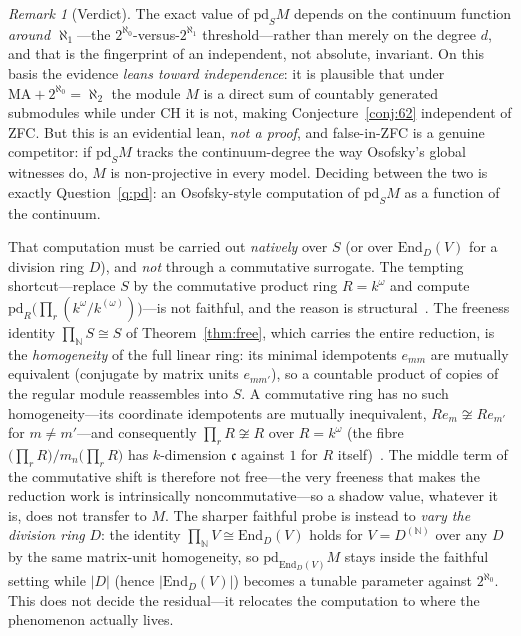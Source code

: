 \documentclass[11pt,reqno]{amsart}
\theoremstyle{plain}
\theoremstyle{definition}
\theoremstyle{remark}
\newtheorem{remark}[theorem]{Remark}
\newcommand{\End}{\mathrm{End}}
\newcommand{\pd}{\mathrm{pd}}
\newcommand{\N}{\mathbb{N}}
\begin{document}
\begin{remark}[Verdict]\label{rem:verdict}
The exact value of $\pd_S M$ depends on the continuum function \emph{around $\aleph_1$}---the $2^{\aleph_0}$-versus-$2^{\aleph_1}$ threshold---rather than merely on the degree $d$, and that is the fingerprint of an independent, not absolute, invariant. On this basis the evidence \emph{leans toward independence}: it is plausible that under $\mathrm{MA}+2^{\aleph_0}=\aleph_2$ the module $M$ is a direct sum of countably generated submodules while under CH it is not, making Conjecture~\ref{conj:62} independent of ZFC. But this is an evidential lean, \emph{not a proof}, and false-in-ZFC is a genuine competitor: if $\pd_S M$ tracks the continuum-degree the way Osofsky's global witnesses do, $M$ is non-projective in every model. Deciding between the two is exactly Question~\ref{q:pd}: an Osofsky-style computation of $\pd_S M$ as a function of the continuum.

That computation must be carried out \emph{natively} over $S$ (or over $\End_D(V)$ for a division ring $D$), and \emph{not} through a commutative surrogate. The tempting shortcut---replace $S$ by the commutative product ring $R=k^{\omega}$ and compute $\pd_R\bigl(\prod_r(k^{\omega}/k^{(\omega)})\bigr)$---is not faithful, and the reason is structural~\cite{macbeth-shadow}. The freeness identity $\prod_{\N}S\cong S$ of Theorem~\ref{thm:free}, which carries the entire reduction, is the \emph{homogeneity} of the full linear ring: its minimal idempotents $e_{mm}$ are mutually equivalent (conjugate by matrix units $e_{mm'}$), so a countable product of copies of the regular module reassembles into $S$. A commutative ring has no such homogeneity---its coordinate idempotents are mutually inequivalent, $Re_m\not\cong Re_{m'}$ for $m\ne m'$---and consequently $\prod_r R\not\cong R$ over $R=k^{\omega}$ (the fibre $\bigl(\prod_r R\bigr)/m_n\bigl(\prod_r R\bigr)$ has $k$-dimension $\mathfrak c$ against $1$ for $R$ itself)~\cite[\S1--2]{macbeth-shadow}. The middle term of the commutative shift is therefore not free---the very freeness that makes the reduction work is intrinsically noncommutative---so a shadow value, whatever it is, does not transfer to $M$. The sharper faithful probe is instead to \emph{vary the division ring} $D$: the identity $\prod_{\N}V\cong\End_D(V)$ holds for $V=D^{(\N)}$ over any $D$ by the same matrix-unit homogeneity, so $\pd_{\End_D(V)}M$ stays inside the faithful setting while $|D|$ (hence $|\End_D(V)|$) becomes a tunable parameter against $2^{\aleph_0}$. This does not decide the residual---it relocates the computation to where the phenomenon actually lives.
\end{remark}
\end{document}
